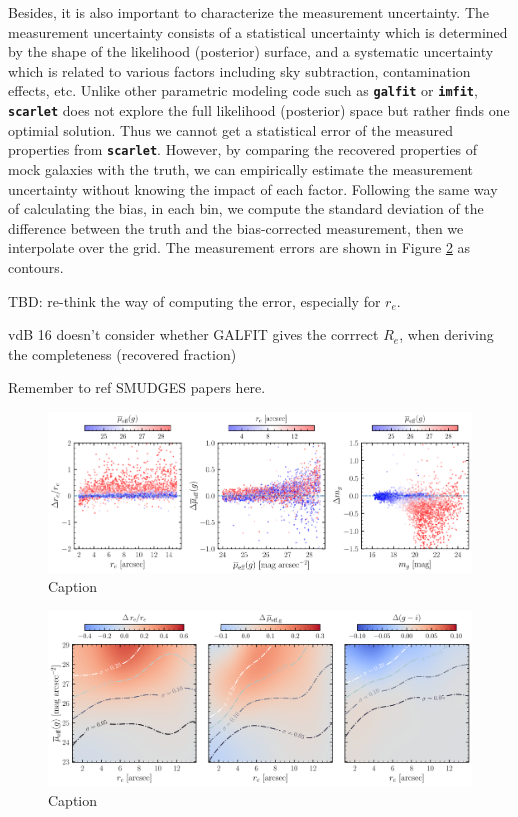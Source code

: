 \documentclass[twocolumn,astrosymb,twocolappendix]{aastex631}
\newcommand{\code}[1]{\textbf{\texttt{#1}}}
\begin{document}
\begin{CJK*}{UTF8}{gbsn}
Besides, it is also important to characterize the measurement uncertainty. The measurement uncertainty consists of a statistical uncertainty which is determined by the shape of the likelihood (posterior) surface, and a systematic uncertainty which is related to various factors including sky subtraction, contamination effects, etc. Unlike other parametric modeling code such as \code{galfit} or \code{imfit}, \code{scarlet} does not explore the full likelihood (posterior) space but rather finds one optimial solution. Thus we cannot get a statistical error of the measured properties from \code{scarlet}. However, by comparing the recovered properties of mock galaxies with the truth, we can empirically estimate the measurement uncertainty without knowing the impact of each factor. Following the same way of calculating the bias, in each bin, we compute the standard deviation of the difference between the truth and the bias-corrected measurement, then we interpolate over the grid. The measurement errors are shown in Figure \ref{fig:meas_err} as contours. 



TBD: re-think the way of computing the error, especially for $r_e$. 


vdB 16 doesn't consider whether GALFIT gives the corrrect $R_e$, when deriving the completeness (recovered fraction)

Remember to ref SMUDGES papers here.

\begin{figure}
	\vbox{ 
		\centering
		\includegraphics[width=1\linewidth]{meas_bias.pdf}
	}
    \caption{Caption}
    \label{fig:meas_bias}
\end{figure}


\begin{figure}
	\vbox{ 
		\centering
		\includegraphics[width=1\linewidth]{meas_error_spergel.pdf}
	}
    \caption{Caption}
    \label{fig:meas_err}
\end{figure}


\end{CJK*}
\end{document}
